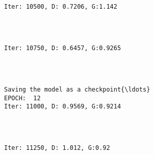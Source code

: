 \documentclass[11pt]{article}
\begin{document}
    \begin{center}
    \end{center}
    { \hspace*{\fill} \\}
    
    \begin{Verbatim}[commandchars=\\\{\}]

Iter: 10500, D: 0.7206, G:1.142
    \end{Verbatim}

    \begin{center}
    \end{center}
    { \hspace*{\fill} \\}
    
    \begin{Verbatim}[commandchars=\\\{\}]

Iter: 10750, D: 0.6457, G:0.9265
    \end{Verbatim}

    \begin{center}
    \end{center}
    { \hspace*{\fill} \\}
    
    \begin{Verbatim}[commandchars=\\\{\}]

Saving the model as a checkpoint{\ldots}
EPOCH:  12
Iter: 11000, D: 0.9569, G:0.9214
    \end{Verbatim}

    \begin{center}
    \end{center}
    { \hspace*{\fill} \\}
    
    \begin{Verbatim}[commandchars=\\\{\}]

Iter: 11250, D: 1.012, G:0.92
    \end{Verbatim}
\end{document}
